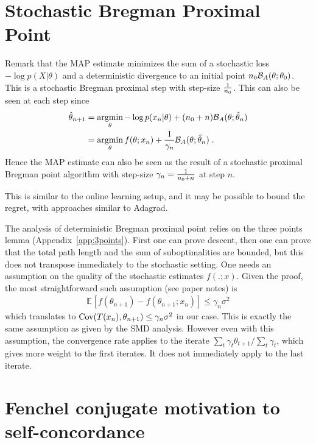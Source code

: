 \documentclass{article}
\newcommand*{\expect}[2][]{\ensuremath{\mathbb{E}_{#1} \left[ #2 \right] }} %
\newcommand{\logpart}{A}
\newcommand{\bregman}{\cB_\logpart}
\newcommand{\natp}{\theta}
\newcommand{\lr}{\gamma} %
\begin{document}
\section{Stochastic Bregman Proximal Point}
Remark that the MAP estimate minimizes the sum of a stochastic loss $ -\log p(X|\natp)$ and a deterministic divergence to an initial point $n_0 \bregman(\natp ; \natp_0)$. This is a stochastic Bregman proximal step with step-size $\frac{1}{n_0}$. This can also be seen at each step since
\begin{align}
    \hat \natp_{n+1} 
    &= \argmin_\natp -\log p(x_{n}|\natp) + (n_0 + n) \bregman(\natp ; \hat \natp_n) \\
    &= \argmin_\natp f(\natp; x_{n}) +  \inv{\gamma_{n}}\bregman(\natp ; \hat \natp_n) \; .
\end{align}
Hence the MAP estimate can also be seen as the result of a stochastic proximal Bregman point algorithm with step-size $\gamma_n = \frac{1}{n_0 + n}$ at step $n$.

This is similar to the online learning setup, and it may be possible to bound the regret, with approaches similar to Adagrad.

The analysis of deterministic Bregman proximal point relies on the three points lemma (Appendix~\ref{app:3points}). First one can prove descent, then one can prove that the total path length and the sum of suboptimalities are bounded, but this does not transpose immediately to the stochastic setting. One needs an assumption on the quality of the stochastic estimates $f(. ; x)$. 
Given the proof, the most straightforward such assumption (see paper notes) is 
\begin{align}
\expect{f(\natp_{n+1}) - f(\natp_{n+1} ; x_{n})} \leq \gamma_n \sigma^2
\end{align}
which translates to $\Cov(T(x_{n}) , \natp_{n+1}) \leq  \gamma_n \sigma^2$ in our case. This is exactly the same assumption as given by the SMD analysis. However even with this assumption, the convergence rate applies to the iterate $\sum_t \lr_t \natp_{t+1} / \sum_t \lr_t$, which gives more weight to the first iterates. It does not immediately apply to the last iterate.


\section{Fenchel conjugate motivation to self-concordance}
\end{document}

